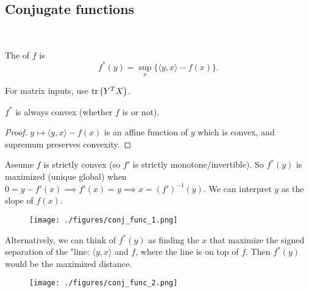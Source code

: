 \documentclass[class=article,crop=false]{standalone}
\begin{document}
\newpage
\subsection{Conjugate functions}

~\begin{defn}
	The  of $ f$ is
	 \[
		 f^* (y) = \sup_x \{\langle y,x \rangle - f(x)\}
	.\] 
\end{defn}
\begin{note}
	For matrix inputs, use $ \operatorname{tr}\left( Y^{T} X \right) $.
\end{note}

\begin{prop}
	$ f^* $ is always convex (whether $ f$ is or not).
\end{prop}
\begin{proof}
	$ y \mapsto \langle y,x \rangle - f(x)$ is an affine function of $ y$ which is convex, and supremum preserves convexity. 
\end{proof}

\begin{eg}
	Assume $ f$ is strictly convex (so $ f'$ is strictly monotone/invertible). So $ f^* (y)$ is maximized (unique global) when $ 0= y- f'(x) \implies f'(x) = y \implies x= \left( f' \right)^{-1} (y) $. We can interpret $ y$ as the slope of $ f(x)$.
	~\begin{figure}[H]
		\centering
		\texttt{[image: ./figures/conj\_func\_1.png]}
	\end{figure}

	Alternatively, we can think of  $ f^* (y)$ as finding the $ x$ that maximize the signed separation of the "line:  $ \langle y,x \rangle$ and $ f$, where the line is on top of  $ f$. Then  $ f^* (y)$ would be the maximized distance.
	~\begin{figure}[H]
		\centering
		\texttt{[image: ./figures/conj\_func\_2.png]}
	\end{figure}
\end{eg}
\end{document}
